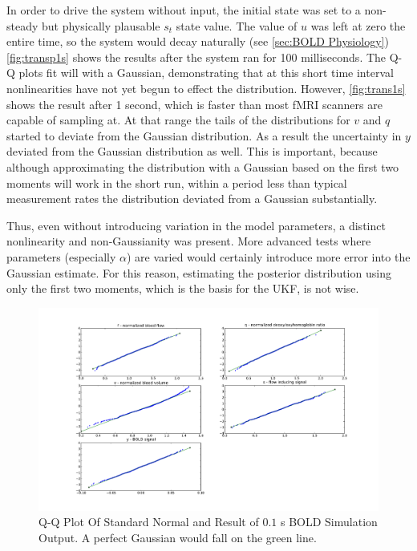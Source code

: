 In order to drive the system without input, the initial state was set
to a non-steady but physically 
plausable $s_t$ state value. The value of $u$ was left at zero 
the entire time, so the 
system would decay naturally (see \autoref{sec:BOLD Physiology})
\autoref{fig:transp1s} shows the results after the
system ran for 100 milliseconds. 
The Q-Q plots fit will with a Gaussian, demonstrating that at this short
time interval nonlinearities have not yet begun to effect the distribution.
However, \autoref{fig:trans1s} shows the result after 1 second, which is faster
than most \ac{fMRI} scanners are capable of sampling at. At that range the tails 
of the distributions for $v$ and $q$ started to deviate from the
Gaussian distribution. As a result the uncertainty in $y$ deviated from
the Gaussian distribution as well. This is important, because although 
approximating the distribution with a Gaussian based on the first two
moments will work in the short run, within a period less than typical
measurement rates the distribution deviated from a Gaussian substantially. 

Thus, even without introducing variation in the model parameters,
a distinct nonlinearity and non-Gaussianity was present. 
More advanced tests where parameters (especially $\alpha$) are varied
would certainly introduce more error into the Gaussian estimate. 
For this reason, estimating the posterior distribution using only 
the first two moments, which is the basis for the \ac{UKF}, is not wise. 

\begin{figure}
\centering
\includegraphics[trim=6cm .75cm 6cm .75cm,width=16cm]{images/gauss_step_point1sec_3sigma.pdf}
\caption[Q-Q Plot Of Standard Normal and Result of $0.1$ s \ac{BOLD} Simulation Output]
{Q-Q Plot Of Standard Normal and Result of $0.1$ s \ac{BOLD} Simulation Output. A
perfect Gaussian would fall on the green line.}
\label{fig:transp1s}
\end{figure}

